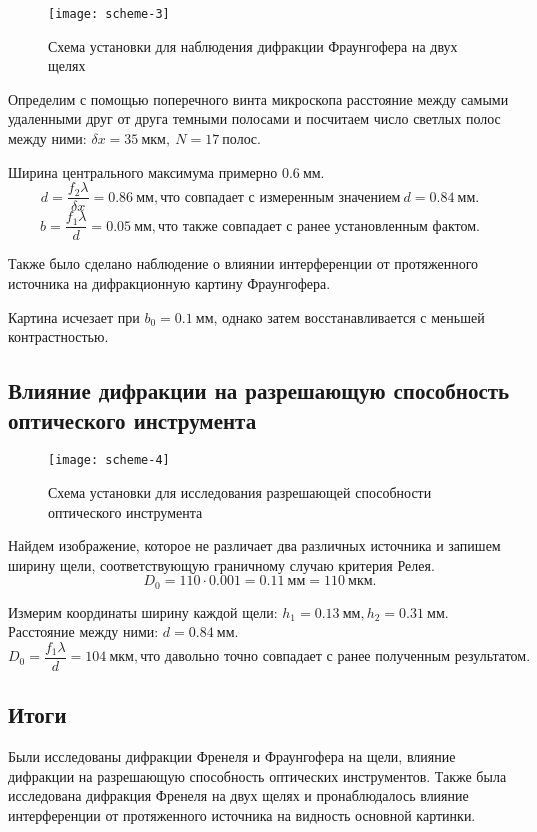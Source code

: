 \documentclass{lab}
\begin{document}
\begin{figure}[H]
	\centering
	\texttt{[image: scheme-3]}
	\caption{Схема установки для наблюдения дифракции Фраунгофера на двух щелях}
	\label{scheme-3}
\end{figure}

Определим с помощью поперечного винта микроскопа расстояние между самыми удаленными друг от друга темными полосами и посчитаем число светлых полос между ними: $ \delta x = 35~мкм, ~ N = 17~полос $.

Ширина центрального максимума примерно $ 0.6~мм $.
\begin{equation}
d = \dfrac{f_2 \lambda}{\delta x} = 0.86~мм, \text{что совпадает с измеренным значением} ~ d = 0.84~мм.
\end{equation}
\begin{equation}
b = \dfrac{f_1 \lambda}{d} = 0.05~мм, \text{что также совпадает с ранее установленным фактом.}
\end{equation}

Также было сделано наблюдение о влиянии интерференции от протяженного источника на дифракционную картину Фраунгофера.

Картина исчезает при $ b_0 = 0.1~мм $, однако затем восстанавливается с меньшей контрастностью.

\subsection*{Влияние дифракции на разрешающую способность оптического инструмента}

\begin{figure}[H]
	\centering
	\texttt{[image: scheme-4]}
	\caption{Схема установки для исследования разрешающей способности оптического инструмента}
	\label{scheme-4}
\end{figure}

Найдем изображение, которое не различает два различных источника и запишем ширину щели, соответствующую граничному случаю критерия Релея.
\begin{equation}
D_0 = 110 \cdot 0.001 = 0.11~мм = 110~мкм.
\end{equation}

Измерим координаты ширину каждой щели: $ h_1 = 0.13~мм, h_2 = 0.31~мм $. Расстояние между ними: $ d = 0.84~мм. $
\begin{equation}
D_0 = \dfrac{f_1 \lambda}{d} = 104~мкм, \text{что давольно точно совпадает с ранее полученным результатом.}
\end{equation}

\subsection*{Итоги}

Были исследованы дифракции Френеля и Фраунгофера на щели, влияние дифракции на разрешающую способность оптических инструментов.
Также была исследована дифракция Френеля на двух щелях и пронаблюдалось влияние интерференции от протяженного источника на видность основной картинки.
\end{document}
